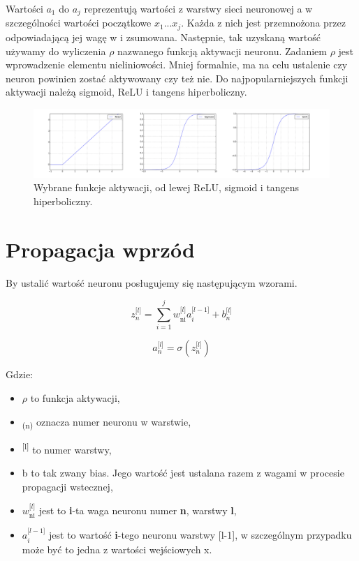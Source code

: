 Wartości \(a_1\) do \(a_j\) reprezentują wartości z warstwy sieci neuronowej a w szczególności wartości początkowe \(x_1 ... x_j\). Każda z nich jest przemnożona przez odpowiadającą jej wagę w i zsumowana. Następnie, tak uzyskaną wartość używamy do wyliczenia \(\rho\) nazwanego funkcją aktywacji neuronu. Zadaniem \(\rho\) jest wprowadzenie elementu nieliniowości. Mniej formalnie, ma na celu ustalenie czy neuron powinien zostać aktywowany czy też nie.
Do najpopularniejszych funkcji aktywacji należą sigmoid, ReLU i tangens hiperboliczny.

\begin{figure}[ht]
\centerline{\includegraphics[scale=0.7]{resources/activations.png}}
\caption{Wybrane funkcje aktywacji, od lewej ReLU, sigmoid i tangens hiperboliczny.}
\label{fig:activations}
\end{figure}

\section{Propagacja wprzód}

By ustalić wartość neuronu posługujemy się następującym wzorami.

\[z_{n}^{\lbrack l\rbrack}=\sum_{i=1}^{j}{w_{\text{ni}}^{\lbrack l\rbrack}a_{i}^{\lbrack l - 1\rbrack} + b_{n}^{\lbrack l\rbrack}}\]

\[a_{n}^{\lbrack l\rbrack}=\sigma(z_{n}^{\lbrack l\rbrack})\]

Gdzie:
\begin{itemize}
\item \(\rho\) to funkcja aktywacji,
\item \textsubscript{(n)} oznacza numer neuronu w warstwie,
\item \textsuperscript{{[}l{]}} to numer warstwy,
\item b to tak zwany bias. Jego wartość jest ustalana razem z wagami w procesie propagacji wstecznej,
\item \(w_{\text{ni}}^{\lbrack l\rbrack}\) jest to \textbf{i}-ta waga neuronu numer \textbf{n}, warstwy \textbf{l},
\item \(a_{i}^{\lbrack l - 1\rbrack}\) jest to wartość \textbf{i}-tego neuronu warstwy {[}l-1{]}, w szczególnym przypadku może być to jedna z wartości wejściowych x.
\end{itemize}

